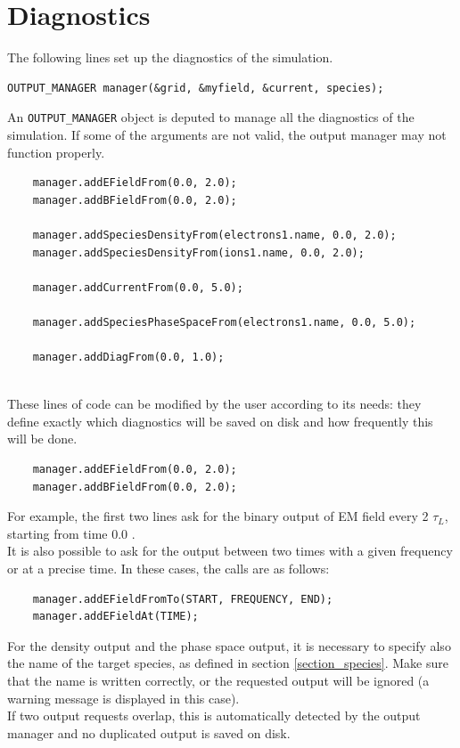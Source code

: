 \documentclass[11pt,a4paper]{report}
\begin{document}
\section{Diagnostics}
The following lines set up the diagnostics of the simulation.
\begin{lstlisting}[backgroundcolor=\color{no_modify}]
	OUTPUT_MANAGER manager(&grid, &myfield, &current, species);
\end{lstlisting}
An \verb+OUTPUT_MANAGER+ object is deputed to manage all the diagnostics of the simulation. If some of the arguments are not valid, the output manager may not function properly.
\begin{lstlisting}
	manager.addEFieldFrom(0.0, 2.0);
	manager.addBFieldFrom(0.0, 2.0);

	manager.addSpeciesDensityFrom(electrons1.name, 0.0, 2.0);
	manager.addSpeciesDensityFrom(ions1.name, 0.0, 2.0);
	
	manager.addCurrentFrom(0.0, 5.0);
	
	manager.addSpeciesPhaseSpaceFrom(electrons1.name, 0.0, 5.0);
	
	manager.addDiagFrom(0.0, 1.0);
	
\end{lstlisting}
These lines of code can be modified by the user according to its needs: they define exactly which diagnostics will be saved on disk and how frequently this will be done.
\begin{lstlisting}
	manager.addEFieldFrom(0.0, 2.0);
	manager.addBFieldFrom(0.0, 2.0);
\end{lstlisting}
For example, the first two lines ask for the binary output of EM field every 2 $\tau_L$, starting from time 0.0 . \\
It is also possible to ask for the output between two times with a given frequency or at a precise time. In these cases, the calls are as follows:
\begin{lstlisting}
	manager.addEFieldFromTo(START, FREQUENCY, END);
	manager.addEFieldAt(TIME);
\end{lstlisting}
For the density output and the phase space output, it is necessary to specify also the name of the target species, as defined in section \ref{section_species}. Make sure that the name is written correctly, or the requested output will be ignored (a warning message is displayed in this case).\\
If two output requests overlap, this is automatically detected by the output manager and no duplicated output is saved on disk. \\
\end{document}
